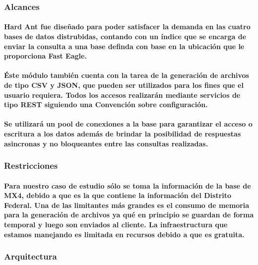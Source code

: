   \subsubsection{Alcances}
    \paragraph{Hard Ant fue diseñado para poder satisfacer la demanda en las cuatro bases de datos distrubidas, contando con un índice que se encarga de enviar la consulta a una base definda con base en la ubicación que le proporciona Fast Eagle.}
    \paragraph{Éste módulo también cuenta con la tarea de la generación de archivos de tipo CSV y JSON, que pueden ser utilizados para los fines que el usuario requiera. Todos los accesos realizarán mediante servicios de tipo REST siguiendo una Convención sobre configuración.} 
    \paragraph{Se utilizará un pool de conexiones a la base para garantizar el acceso o escritura a los datos además de brindar la posibilidad de respuestas asincronas y no bloqueantes entre las consultas realizadas.}
  \subsubsection{Restricciones}
    \paragraph{Para nuestro caso de estudio sólo se toma la información de la base de MX4, debido a que es la que contiene la información del Distrito Federal. Una de las limitantes más grandes es el consumo de memoria para la generación de archivos ya qué en principio se guardan de forma temporal y luego son enviados al cliente. La infraestructura que estamos manejando es limitada en recursos debido a que es gratuita.}
  \subsubsection{Arquitectura}
